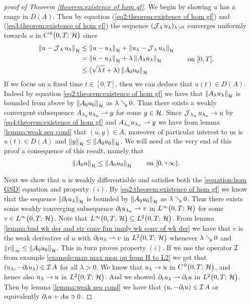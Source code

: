 \begin{proof}[proof of Theorem \ref{theorem:existence of hom gf}]
	We begin by showing $ u $ has a range in $ D(A) $.
	Then by equation (\ref{eq2:theorem:existence of hom gf}) 
	and (\ref{eq3:theorem:existence of hom gf}) 
	the sequence $ (\operatorname{\mathcal{J}}_\lambda u_\lambda)_{\lambda >0} $
	converges uniformly towards $ u $ in $ C^{\, 0}\big(0,T;\,\mathcal{H}\big) $ since
	\begin{align}\label{eq4:theorem:existence of hom gf}
		\begin{split}
			\left\Vert u - \operatorname{\mathcal{J}}_\lambda u_\lambda\right\Vert_{\mathcal{H}}
			&\leq \left\Vert u - u_\lambda\right\Vert_{\mathcal{H}}
			+ \left\Vert u_\lambda - \operatorname{\mathcal{J}}_\lambda u_\lambda\right\Vert_{\mathcal{H}}\\
			&= \left\Vert u - u_\lambda\right\Vert_{\mathcal{H}}
			+ \lambda \left\Vert A_\lambda u_\lambda\right\Vert_{\mathcal{H}}\\
			&\leq (\sqrt{\lambda\, t} + \lambda)\left\Vert A_0 u_0\right\Vert_{\mathcal{H}}
		\end{split}
		\qquad\text{on }[0,T].
	\end{align}
	If we focus on a fixed time $ t\in[0,T] $,
	then we can deduce that $ u(t)\in D(A) $. Indeed
	by equation \eqref{eq2:theorem:existence of hom gf} we
	have that
	$\left\Vert A_\lambda u_\lambda\right\Vert_{\mathcal{H}}$ is bounded from above by $\left\Vert A_0 u_0\right\Vert_{\mathcal{H}} $
	as $ \lambda \searrow 0$.
	Thus there exists a weakly convergent subsequence
	$ A_{\lambda_{n}}u_{\lambda_{n}}\rightharpoonup y $ for some $ y\in\mathcal{H} $.
	Since $ \operatorname{\mathcal{J}}_{\lambda_n} u_{\lambda_n} \rightarrow u $ by 
	\eqref{eq4:theorem:existence of hom gf}
	and $ A_{\lambda_{n}}u_{\lambda_{n}}\rightharpoonup y $ we have 
	from lemma \ref{lemma:weak seq cond}
	that $ (u,y)\in A $, moreover of particular interest
	to us is $ u(t)\in D(A) $ and 
	$ \left\Vert y\right\Vert_{\mathcal{H}}\leq \left\Vert A_0 u_0\right\Vert_{\mathcal{H}} $. 
	We will need at the very end of this proof a consequence of this
	result, namely that
	\begin{align}\label{eq5:theorem:existence of hom gf}
		\norm{A_0 u}\leq\norm{A_0 u_0} 
		\qquad\text{on }[0,\plus\infty).
	\end{align}
	
	Next we show that $ u $ is weakly differentiable and
	satisfies both the \ref{equation:hom GSD} equation and property $ (i) $.
	By \eqref{eq2:theorem:existence of hom gf} we know that
	the sequence $ \left\Vert \partial_t u_\lambda\right\Vert_{\mathcal{H}} $ is bounded 
	by $ \left\Vert A_0 u_0\right\Vert_{\mathcal{H}} $ as $ \lambda\searrow 0 $.
	Thus there exists some weakly converging subsequence 
	$ \partial_t u_{\lambda_n}\rightharpoonup v $ in $ L^{\infty}\big(0,T;\,\mathcal{H}\big) $ 
	for some $ v\in L^{\infty}\big(0,T;\,\mathcal{H}\big)$. Note that $L^{\infty}\big(0,T;\,\mathcal{H}\big)\subseteq L^{2}\big(0,T;\,\mathcal{H}\big) $. 
	From lemma \ref{lemma:bnd wk der and str conv fun imply wk conv of wk der}
	we have that
	$ v $ is the weak derivative of $ u $ 
	with $ \partial_t u_{\lambda}\rightharpoonup v $ in $ L^{2}\big(0,T;\,\mathcal{H}\big) $ whenever $ \lambda\searrow 0 $
	and $ \left\Vert v\right\Vert_{\infty}\leq \left\Vert A_0 u_0\right\Vert_{\mathcal{H}} $. This in turn
	proves property $ (i) $. If we use the operator $ \operatorname{\mathcal{I}} $ from example
	\ref{example:map max mon op from H to L2} we get
	that $ (u_\lambda,-\partial_t u_\lambda)\in\operatorname{\mathcal{I}} A $ for all
	$ \lambda>0 $. We know that
	$ u_\lambda\rightarrow u $ in $ C^{\, 0}\big(0,T;\,\mathcal{H}\big) $, and hence also 
	$ u_\lambda\rightarrow u $ in $ L^{2}\big(0,T;\,\mathcal{H}\big) $.
	And we showed $ \partial_t u_\lambda\rightharpoonup \partial_t u $ in $ L^{2}\big(0,T;\,\mathcal{H}\big) $.
	Then by lemma \ref{lemma:weak seq cond} we have that 
	$ (u,-\partial_t u)\in\operatorname{\mathcal{I}} A $ or 
	equivalently $ \partial_t u+Au\ni 0$.\smallskip
	

\end{proof}
